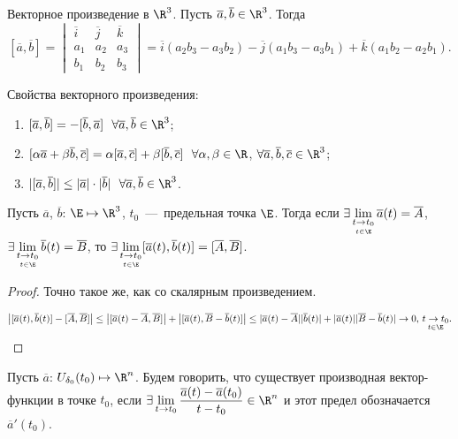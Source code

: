 \begin{reminder}
    Векторное произведение в $\R^3$. Пусть $\overline{a}, \overline{b} \in \R^3$. Тогда
    $$ [\overline{a}, \overline{b}] = \begin{vmatrix}
\overline{i} & \overline{j} & \overline{k}\\
a_1 & a_2 & a_3\\
b_1 & b_2 & b_3
\end{vmatrix}
= \overline{i} (a_2 b_3 - a_3 b_2) - \overline{j} (a_1 b_3 - a_3 b_1) + \overline{k} (a_1 b_2 - a_2 b_1).$$

Свойства векторного произведения:
\begin{enumerate}
    \item $[\overline{a}, \overline{b}] = - [\overline{b}, \overline{a}] \ \ \forall \overline{a}, \overline{b} \in \R^3$;
    \item $[\alpha \overline{a} + \beta \overline{b}, \overline{c}] = \alpha [\overline{a}, \overline{c}] + \beta [\overline{b}, \overline{c}] \ \ \forall \alpha, \beta \in \R$, $\forall \overline{a}, \overline{b}, \overline{c} \in \R^3$;
    \item $| [\overline{a}, \overline{b}]| \leq |\overline{a}| \cdot |\overline{b}| \ \ \forall \overline{a}, \overline{b} \in \R^3$.
\end{enumerate}
\end{reminder}
\begin{lemma}
    Пусть $\overline{a}$, $\overline{b}$: $\E \mapsto \R^3$, $t_0$~---~предельная точка $\E$. Тогда если $\exists \lim\limits_{\underset{t \in\E}{t\to t_{0}}} \overline{a} (t) = \overline{A}$, $\exists \lim\limits_{\underset{t \in\E}{t\to t_{0}}} \overline{b} (t) = \overline{B}$, то $\exists \lim\limits_{\underset{t \in\E}{t\to t_{0}}} [\overline{a} (t), \overline{b} (t)] = [\overline{A}, \overline{B}]$.
\end{lemma}
\begin{proof}
    Точно такое же, как со скалярным произведением.

    $$\left| [\overline{a} (t), \overline{b} (t)] - [\overline{A}, \overline{B}] \right| \leq \left| [\overline{a} (t) - \overline{A}, \overline{B}] \right| + \left| [\overline{a} (t), \overline{B} - \overline{b} (t) ]\right| \leq |\overline{a} (t) - \overline{A}| |\overline{b} (t)| + |\overline{a} (t)| |\overline{B} - \overline{b} (t)| \to 0\text{, }\underset{t\in \E}{t\to t_{0}}.$$
\end{proof}
\begin{definition}
    Пусть $\overline{a}$: $U_{\delta_0} (t_0) \mapsto \R^n$. Будем говорить, что существует производная вектор-функции в точке $t_{0}$, если $\displaystyle \exists \lim\limits_{t\to t_{0}} \frac{\overline{a} (t) - \overline{a} (t_0)}{t - t_{0}} \in \R^n$ и этот предел обозначается $\overline{a}' (t_{0})$.
\end{definition}
